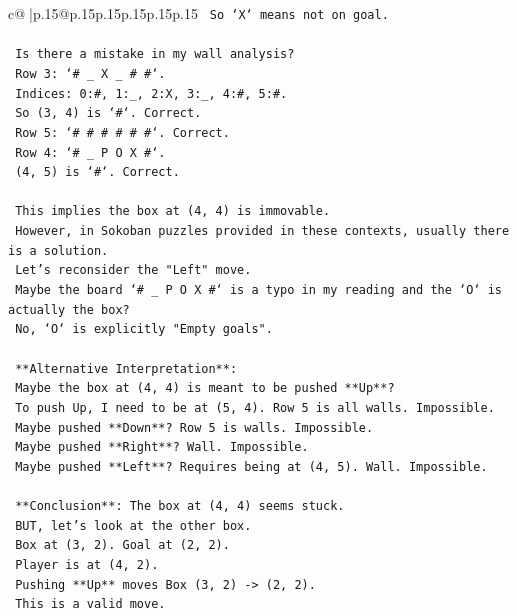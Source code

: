 \documentclass{article}
\begin{document}
{\begin{supertabular}{c@{$\;$}|p{.15\linewidth}@{}p{.15\linewidth}p{.15\linewidth}p{.15\linewidth}p{.15\linewidth}p{.15\linewidth}}
{{{\texttt{     So `X` means not on goal.} \\
\\ 
\texttt{     Is there a mistake in my wall analysis?} \\
\texttt{     Row 3: `\# \_ X \_ \# \#`.} \\
\texttt{     Indices: 0:\#, 1:\_, 2:X, 3:\_, 4:\#, 5:\#.} \\
\texttt{     So (3, 4) is `\#`. Correct.} \\
\texttt{     Row 5: `\# \# \# \# \# \#`. Correct.} \\
\texttt{     Row 4: `\# \_ P O X \#`.} \\
\texttt{     (4, 5) is `\#`. Correct.} \\
\\ 
\texttt{     This implies the box at (4, 4) is immovable.} \\
\texttt{     However, in Sokoban puzzles provided in these contexts, usually there is a solution.} \\
\texttt{     Let's reconsider the "Left" move.} \\
\texttt{     Maybe the board `\# \_ P O X \#` is a typo in my reading and the `O` is actually the box?} \\
\texttt{     No, `O` is explicitly "Empty goals".} \\
\\ 
\texttt{     **Alternative Interpretation**:} \\
\texttt{     Maybe the box at (4, 4) is meant to be pushed **Up**?} \\
\texttt{     To push Up, I need to be at (5, 4). Row 5 is all walls. Impossible.} \\
\texttt{     Maybe pushed **Down**? Row 5 is walls. Impossible.} \\
\texttt{     Maybe pushed **Right**? Wall. Impossible.} \\
\texttt{     Maybe pushed **Left**? Requires being at (4, 5). Wall. Impossible.} \\
\\ 
\texttt{     **Conclusion**: The box at (4, 4) seems stuck.} \\
\texttt{     BUT, let's look at the other box.} \\
\texttt{     Box at (3, 2). Goal at (2, 2).} \\
\texttt{     Player is at (4, 2).} \\
\texttt{     Pushing **Up** moves Box (3, 2) {-}> (2, 2).} \\
\texttt{     This is a valid move.} \\
}}}
\end{supertabular}}
\end{document}
